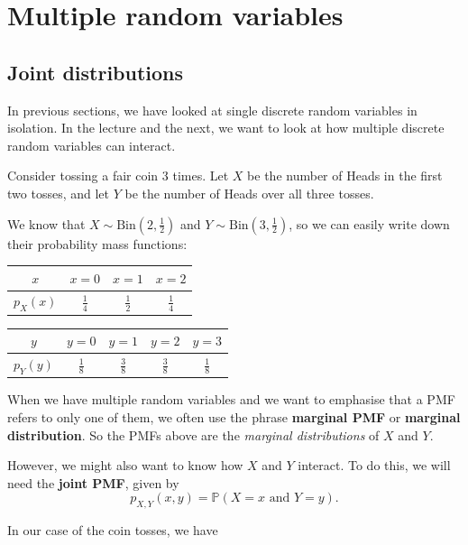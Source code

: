 \documentclass[
  a4paper,
]{book}
\theoremstyle{definition}
\theoremstyle{definition}
\theoremstyle{definition}
\theoremstyle{definition}
\theoremstyle{remark}
\begin{document}
\hypertarget{L13-multi-rv}{%
\chapter{Multiple random variables}\label{L13-multi-rv}}

\hypertarget{joint}{%
\section{Joint distributions}\label{joint}}

In previous sections, we have looked at single discrete random variables in isolation. In the lecture and the next, we want to look at how multiple discrete random variables can interact.

Consider tossing a fair coin 3 times. Let \(X\) be the number of Heads in the first two tosses, and let \(Y\) be the number of Heads over all three tosses.

We know that \(X \sim \text{Bin}(2, \frac12)\) and \(Y \sim \text{Bin}(3, \frac12)\), so we can easily write down their probability mass functions:

\begin{longtable}[]{@{}cccc@{}}
\toprule()
\(x\) & \(x = 0\) & \(x = 1\) & \(x = 2\) \\
\midrule()
\endhead
\(p_X(x)\) & \(\frac14\) & \(\frac12\) & \(\frac14\) \\
\bottomrule()
\end{longtable}

\begin{longtable}[]{@{}ccccc@{}}
\toprule()
\(y\) & \(y = 0\) & \(y = 1\) & \(y = 2\) & \(y = 3\) \\
\midrule()
\endhead
\(p_Y(y)\) & \(\frac18\) & \(\frac38\) & \(\frac38\) & \(\frac18\) \\
\bottomrule()
\end{longtable}

When we have multiple random variables and we want to emphasise that a PMF refers to only one of them, we often use the phrase \textbf{marginal PMF} or \textbf{marginal distribution}. So the PMFs above are the \emph{marginal distributions} of \(X\) and \(Y\).

However, we might also want to know how \(X\) and \(Y\) interact. To do this, we will need the \textbf{joint PMF}, given by
\[ p_{X,Y}(x,y) = \mathbb P(X = x \text{ and } Y = y) . \]

In our case of the coin tosses, we have
\end{document}
